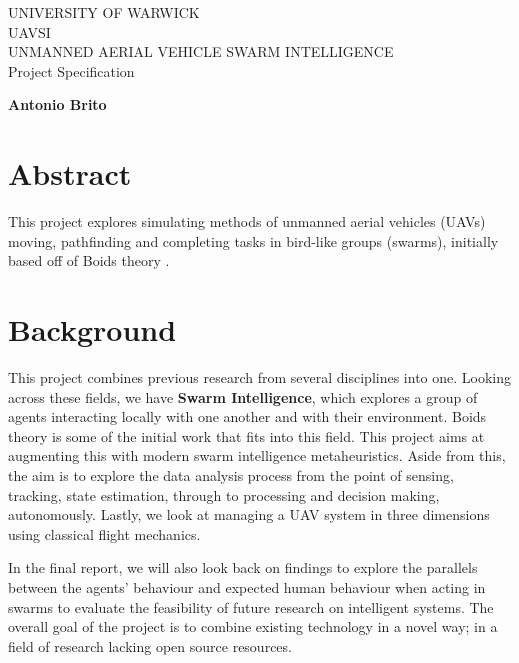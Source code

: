 \documentclass{article}
\begin{document}
\begin{titlepage}
   \begin{center}
        \large UNIVERSITY OF WARWICK\\
       \vspace*{8cm}
        \Huge UAVSI
        \\
        \vspace{0.5cm}
        \normalsize UNMANNED AERIAL VEHICLE SWARM INTELLIGENCE
        \\
        \vspace{0.2cm}
        Project Specification
            
       \vspace{5cm}

       \large \textbf{Antonio Brito}
			
			\smallskip

       \vfill

   \end{center}
\end{titlepage}


\section{Abstract}
This project explores simulating methods of unmanned aerial vehicles (UAVs) moving, pathfinding and completing tasks in bird-like groups (swarms), initially based off of Boids theory \cite{10.1145/37402.37406}.

\section{Background}
This project combines previous research from several disciplines into one. Looking across these fields, we have \textbf{Swarm Intelligence}, which explores a group of agents interacting locally with one another and with their environment\cite{9173524}. Boids theory is some of the initial work that fits into this field. This project aims at augmenting this with modern swarm intelligence metaheuristics. Aside from this, the aim is to explore the data analysis process from the point of sensing, tracking, state estimation, through to processing and decision making, autonomously. Lastly, we look at managing a UAV system in three dimensions using classical flight mechanics.

In the final report, we will also look back on findings to explore the parallels between the agents' behaviour and expected human behaviour when acting in swarms to evaluate the feasibility of future research on intelligent systems. The overall goal of the project is to combine existing technology in a novel way; in a field of research lacking open source resources.
\end{document}

